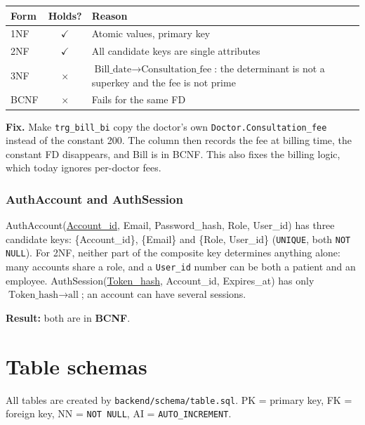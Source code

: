 \documentclass[11pt,a4paper]{article}
\newcommand{\code}[1]{\texttt{#1}}
\newcommand{\yes}{$\checkmark$}
\newcommand{\no}{$\times$}
\begin{document}
\begin{center}
\small
\begin{tabularx}{0.92\textwidth}{l c L}
\toprule
\textbf{Form} & \textbf{Holds?} & \textbf{Reason} \\
\midrule
1NF  & \yes & Atomic values, primary key \\
2NF  & \yes & All candidate keys are single attributes \\
3NF  & \no  & $\text{Bill\_date} \rightarrow \text{Consultation\_fee}$: the determinant is not a superkey and the fee is not prime \\
BCNF & \no  & Fails for the same FD \\
\bottomrule
\end{tabularx}
\end{center}

\textbf{Fix.} Make \code{trg\_bill\_bi} copy the doctor's own \code{Doctor.Consultation\_fee} instead of the constant 200. The column then records the fee at billing time, the constant FD disappears, and Bill is in BCNF. This also fixes the billing logic, which today ignores per-doctor fees.

\subsubsection*{AuthAccount and AuthSession}
AuthAccount(\underline{Account\_id}, Email, Password\_hash, Role, User\_id) has three candidate keys: \{Account\_id\}, \{Email\} and \{Role, User\_id\} (\code{UNIQUE}, both \code{NOT NULL}). For 2NF, neither part of the composite key determines anything alone: many accounts share a role, and a \code{User\_id} number can be both a patient and an employee. AuthSession(\underline{Token\_hash}, Account\_id, Expires\_at) has only $\text{Token\_hash} \rightarrow \text{all}$; an account can have several sessions.

\textbf{Result:} both are in \textbf{BCNF}.

\section{Table schemas}
\label{sec:schemas}

All tables are created by \code{backend/schema/table.sql}. PK = primary key, FK = foreign key, NN = \code{NOT NULL}, AI = \code{AUTO\_INCREMENT}.
\end{document}
